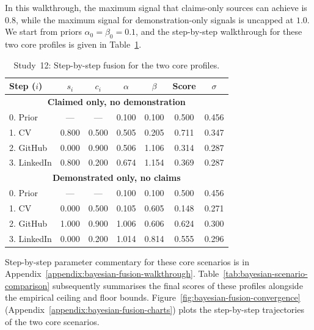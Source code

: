 In this walkthrough, the maximum signal that claims-only sources can achieve is $0.8$, while the maximum signal for demonstration-only signals
is uncapped at $1.0$. We start from priors $\alpha_0 = \beta_0 = 0.1$, and the step-by-step walkthrough for these two core profiles is given in Table~\ref{tab:bayesian-walkthrough}.

\begin{table}[htbp]
    \centering
    \caption[Study~12: Claims vs.\ demonstration walkthrough]{Study~12: Step-by-step fusion for the two core profiles.}
    \label{tab:bayesian-walkthrough}
    \small
    \setlength{\tabcolsep}{5pt}
    \begin{tabular}{l c c c c c c}
        \toprule
        \textbf{Step} ($i$) & $s_i$ & $c_i$ & $\alpha$ & $\beta$ & \textbf{Score} & $\sigma$ \\ \midrule
        \multicolumn{7}{c}{\textbf{Claimed only, no demonstration}} \\ \midrule
        0. Prior            & ---   & ---   & 0.100 & 0.100 & 0.500 & 0.456 \\
        1. CV               & 0.800 & 0.500 & 0.505 & 0.205 & 0.711 & 0.347 \\
        2. GitHub           & 0.000 & 0.900 & 0.506 & 1.106 & 0.314 & 0.287 \\
        3. LinkedIn         & 0.800 & 0.200 & 0.674 & 1.154 & 0.369 & 0.287 \\ \midrule
        \multicolumn{7}{c}{\textbf{Demonstrated only, no claims}} \\ \midrule
        0. Prior            & ---   & ---   & 0.100 & 0.100 & 0.500 & 0.456 \\
        1. CV               & 0.000 & 0.500 & 0.105 & 0.605 & 0.148 & 0.271 \\
        2. GitHub           & 1.000 & 0.900 & 1.006 & 0.606 & 0.624 & 0.300 \\
        3. LinkedIn         & 0.000 & 0.200 & 1.014 & 0.814 & 0.555 & 0.296 \\ \bottomrule
    \end{tabular}
\end{table}

Step-by-step parameter commentary for these core scenarios is in Appendix~\ref{appendix:bayesian-fusion-walkthrough}.
Table~\ref{tab:bayesian-scenario-comparison} subsequently summarises the final scores of these profiles alongside the empirical ceiling and floor bounds.
Figure~\ref{fig:bayesian-fusion-convergence} (Appendix~\ref{appendix:bayesian-fusion-charts}) plots the step-by-step trajectories of the two core scenarios.

